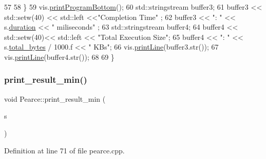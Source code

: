 \begin{DoxyCode}
57             
58     \}
59     vis.\hyperlink{class_visualize_ac0be9ece2d80a7d1e34724fb87424216}{printProgramBottom}();
60     std::stringstream buffer3;
61             buffer3 << std::setw(40) << std::left <<\textcolor{stringliteral}{"Completion Time"} ;
62             buffer3 << \textcolor{stringliteral}{": "} << s.\hyperlink{struct_utility_structs_1_1_storage_items_a65e7df5611a4e144cc27576bd3041f6c}{duration} << \textcolor{stringliteral}{" miliseconds"} ;
63             std::stringstream buffer4;
64             buffer4 << std::setw(40)<< std::left << \textcolor{stringliteral}{"Total Execution Size"};
65             buffer4 << \textcolor{stringliteral}{": "} << s.\hyperlink{struct_utility_structs_1_1_storage_items_a39cf482db54d8e6ac473b438444c8a1e}{total\_bytes} / 1000.f << \textcolor{stringliteral}{" KBs"};
66             vis.\hyperlink{class_visualize_abce6cd538dc0715b21851e0bf0377d85}{printLine}(buffer3.str());
67             vis.\hyperlink{class_visualize_abce6cd538dc0715b21851e0bf0377d85}{printLine}(buffer4.str());
68 
69 \}
\end{DoxyCode}
\mbox{\label{class_pearce_af2a6f31643617305794c06b5d2c85ebe}} 
\subsubsection{\texorpdfstring{print\+\_\+result\+\_\+min()}{print\_result\_min()}}
{\footnotesize\ttfamily void Pearce\+::print\+\_\+result\+\_\+min (\begin{DoxyParamCaption}\item[{\hyperlink{struct_utility_structs_1_1_storage_items}{Utility\+Structs\+::\+Storage\+Items} \&}]{s }\end{DoxyParamCaption})}



Definition at line 71 of file pearce.\+cpp.


